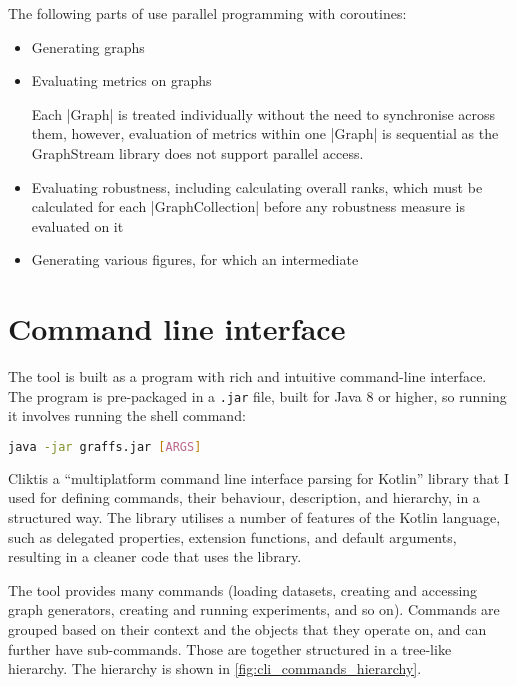The following parts of \graffs use parallel programming with coroutines:
\begin{itemize}[topsep=5pt]
    \item Generating graphs
    \item Evaluating metrics on graphs

    Each |Graph| is treated individually without the need to synchronise across them, however, evaluation of metrics within one |Graph| is sequential as the GraphStream library does not support parallel access.
    \item Evaluating robustness, including calculating overall ranks, which must be calculated for each |GraphCollection| before any robustness measure is evaluated on it
    \item Generating various figures, for which an intermediate
\end{itemize}


\section{Command line interface}\label{sec:cli}

The \graffs tool is built as a program with rich and intuitive command-line interface.
The program is pre-packaged in a \texttt{.jar} file, built for Java 8 or higher, so running it involves running the shell command:
\begin{lstlisting}[language=bash,style=light]
java -jar graffs.jar [ARGS]
\end{lstlisting}

Clikt\citeneeded is a \enquote{multiplatform command line interface parsing for Kotlin} library that I used for defining commands, their behaviour, description, and hierarchy, in a structured way.
The library utilises a number of features of the Kotlin language, such as delegated properties, extension functions, and default arguments, resulting in a cleaner code that uses the library.

The \graffs tool provides many commands (loading datasets, creating and accessing graph generators, creating and running experiments, and so on).
Commands are grouped based on their context and the objects that they operate on, and can further have sub-commands.
Those are together structured in a tree-like hierarchy.
The hierarchy is shown in \autoref{fig:cli_commands_hierarchy}.



